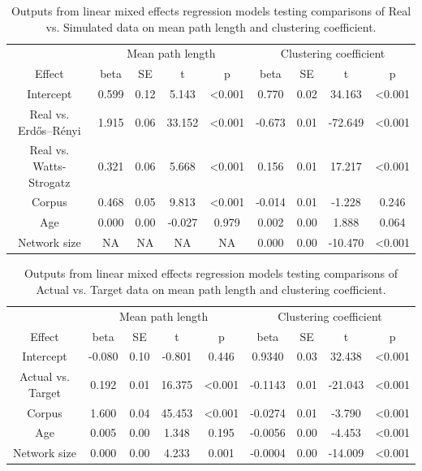 \documentclass[
  man]{apa6}
\begin{document}
\begin{longtable}[t]{ccccccccc}
\caption{\label{tab:table-real-sim}Outputs from linear mixed effects regression models testing comparisons of Real vs. Simulated data on mean path length and clustering coefficient.}\\
\toprule
\multicolumn{1}{c}{ } & \multicolumn{4}{c}{Mean path length} & \multicolumn{4}{c}{Clustering coefficient} \\
\cmidrule(l{3pt}r{3pt}){2-5} \cmidrule(l{3pt}r{3pt}){6-9}
Effect & beta & SE & t & p & beta & SE & t & p\\
\midrule
Intercept & 0.599 & 0.12 & 5.143 & <0.001 & 0.770 & 0.02 & 34.163 & <0.001\\
Real vs. Erdős–Rényi & 1.915 & 0.06 & 33.152 & <0.001 & -0.673 & 0.01 & -72.649 & <0.001\\
Real vs. Watts-Strogatz & 0.321 & 0.06 & 5.668 & <0.001 & 0.156 & 0.01 & 17.217 & <0.001\\
Corpus & 0.468 & 0.05 & 9.813 & <0.001 & -0.014 & 0.01 & -1.228 & 0.246\\
Age & 0.000 & 0.00 & -0.027 & 0.979 & 0.002 & 0.00 & 1.888 & 0.064\\
\addlinespace
Network size & NA & NA & NA & NA & 0.000 & 0.00 & -10.470 & <0.001\\
\bottomrule
\end{longtable}

\begin{longtable}[t]{ccccccccc}
\caption{\label{tab:table-actual-target}Outputs from linear mixed effects regression models testing comparisons of Actual vs. Target data on mean path length and clustering coefficient.}\\
\toprule
\multicolumn{1}{c}{ } & \multicolumn{4}{c}{Mean path length} & \multicolumn{4}{c}{Clustering coefficient} \\
\cmidrule(l{3pt}r{3pt}){2-5} \cmidrule(l{3pt}r{3pt}){6-9}
Effect & beta & SE & t & p & beta & SE & t & p\\
\midrule
Intercept & -0.080 & 0.10 & -0.801 & 0.446 & 0.9340 & 0.03 & 32.438 & <0.001\\
Actual vs. Target & 0.192 & 0.01 & 16.375 & <0.001 & -0.1143 & 0.01 & -21.043 & <0.001\\
Corpus & 1.600 & 0.04 & 45.453 & <0.001 & -0.0274 & 0.01 & -3.790 & <0.001\\
Age & 0.005 & 0.00 & 1.348 & 0.195 & -0.0056 & 0.00 & -4.453 & <0.001\\
Network size & 0.000 & 0.00 & 4.233 & 0.001 & -0.0004 & 0.00 & -14.009 & <0.001\\
\bottomrule
\end{longtable}
\end{document}
